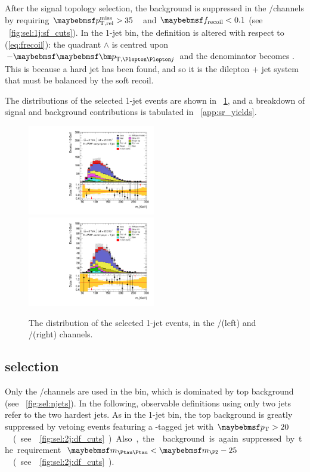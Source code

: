 After the signal topology selection, the \DYll background is suppressed in the 
\eech/\mmch channels by requiring \unit{$\trackmetrel > 35$}{\GeV} and $\frecoil < 0.1$ 
(see \Figure~\ref{fig:sel:1j:sf_cuts}). In the 1-jet bin, the \frecoil definition is 
altered with respect to (\ref{eq:frecoil}): the quadrant $\wedge$ is centred upon 
$-\ptlljvec$ and the denominator becomes \ptllj. This is because a hard jet has been 
found, and so it is the dilepton + jet system that must be balanced by the soft recoil.

The \mt distributions of the selected 1-jet events are shown in \Figure~\ref{fig:sel:1j:mt}, 
and a breakdown of signal and background contributions is tabulated in 
\Appendix~\ref{app:sr_yields}.

\begin{figure}[t]
	\includegraphics[width=0.495\textwidth]{tex/selection/emme_CutFRecoil_1jet_MT_TrackHWW_Clj_mh125_lin}
	\hfill
	\includegraphics[width=0.495\textwidth]{tex/selection/eemm_CutFRecoil_1jet_MT_TrackHWW_Clj_mh125_lin}
	\caption{The \mt distribution of the selected 1-jet events, in the \emch/\mech (left) and 
	\eech/\mmch (right) channels.}
	\label{fig:sel:1j:mt}
\end{figure}



\subsection{\twojet selection}
\label{sec:selection:2j}

Only the \emch/\mech channels are used in the \twojet bin, which is dominated by top 
background (see \Figure~\ref{fig:sel:njets}). In the following, observable definitions using 
only two jets refer to the two hardest jets. As in the 1-jet bin, the top background is 
greatly suppressed by vetoing events featuring a \Pbottom-tagged jet with 
\unit{$\pt > 20$}{\GeV} (see \Figure~\ref{fig:sel:2j:df_cuts}). Also, the \DYtt background 
is again suppressed by the requirement \unit{$\mtautau < \mZ - 25$}{\GeV} (see 
\Figure~\ref{fig:sel:2j:df_cuts}).

